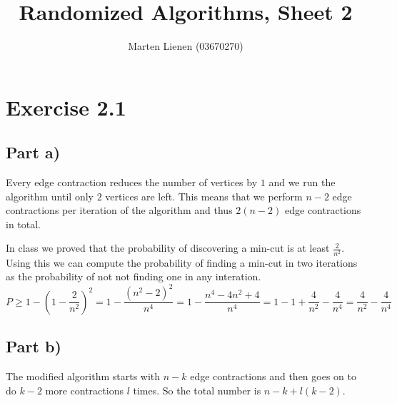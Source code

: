 \documentclass[10pt,a4paper]{article}
\title{Randomized Algorithms, Sheet 2}
\author{Marten Lienen (03670270)}
\begin{document}
\maketitle

\section*{Exercise 2.1}

\subsection*{Part a)}

Every edge contraction reduces the number of vertices by $1$ and we run the algorithm until only $2$ vertices are left.
This means that we perform $n - 2$ edge contractions per iteration of the algorithm and thus $2(n - 2)$ edge contractions in total.

In class we proved that the probability of discovering a min-cut is at least $\frac{2}{n^{2}}$.
Using this we can compute the probability of finding a min-cut in two iterations as the probability of not not finding one in any interation.
\begin{equation*}
  P \ge 1 - \left( 1 - \frac{2}{n^{2}} \right)^{2} = 1 - \frac{\left( n^{2} - 2 \right)^{2}}{n^{4}} = 1 - \frac{n^{4} - 4n^{2} + 4}{n^{4}} = 1 - 1 + \frac{4}{n^{2}} - \frac{4}{n^{4}} = \frac{4}{n^{2}} - \frac{4}{n^{4}}
\end{equation*}

\subsection*{Part b)}

The modified algorithm starts with $n - k$ edge contractions and then goes on to do $k - 2$ more contractions $l$ times.
So the total number is $n - k + l(k - 2)$.
\end{document}
